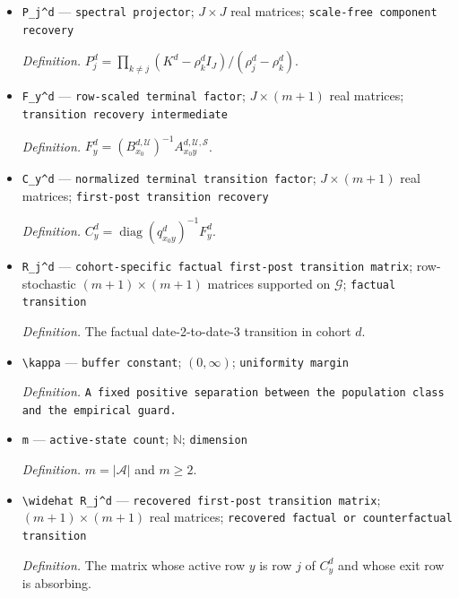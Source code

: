 \documentclass{article}
\begin{document}
\begin{itemize}
  \par\smallskip\noindent\emph{Definition.} The \(j\)-th eigenvalue of \(K^d\), ordered decreasingly.
  \item \texttt{P\_\allowbreak{}j\textasciicircum{}d} --- \texttt{spectral projector}; \(J\times J\) real matrices; \texttt{scale-\allowbreak{}free component recovery}
  \par\smallskip\noindent\emph{Definition.} \(P_j^d=\prod_{k\neq j}(K^d-\rho_k^dI_J)/(\rho_j^d-\rho_k^d)\).
  \item \texttt{F\_\allowbreak{}y\textasciicircum{}d} --- \texttt{row-\allowbreak{}scaled terminal factor}; \(J\times(m+1)\) real matrices; \texttt{transition recovery intermediate}
  \par\smallskip\noindent\emph{Definition.} \(F_y^d=(B_{x_0}^{d,\mathcal U})^{-1}A_{x_0y}^{d,\mathcal U,\mathcal S}\).
  \item \texttt{C\_\allowbreak{}y\textasciicircum{}d} --- \texttt{normalized terminal transition factor}; \(J\times(m+1)\) real matrices; \texttt{first-\allowbreak{}post transition recovery}
  \par\smallskip\noindent\emph{Definition.} \(C_y^d=\operatorname{diag}(q_{x_0y}^d)^{-1}F_y^d\).
  \item \texttt{R\_\allowbreak{}j\textasciicircum{}d} --- \texttt{cohort-\allowbreak{}specific factual first-\allowbreak{}post transition matrix}; row-stochastic \((m+1)\times(m+1)\) matrices supported on \(\mathcal G\); \texttt{factual transition}
  \par\smallskip\noindent\emph{Definition.} The factual date-2-to-date-3 transition in cohort \(d\).
  \item \texttt{\textbackslash{}\allowbreak{}kappa} --- \texttt{buffer constant}; \((0,\infty)\); \texttt{uniformity margin}
  \par\smallskip\noindent\emph{Definition.} \texttt{A fixed positive separation between the population class and the empirical guard.}
  \item \texttt{m} --- \texttt{active-\allowbreak{}state count}; \(\mathbb N\); \texttt{dimension}
  \par\smallskip\noindent\emph{Definition.} \(m=|\mathcal A|\) and \(m\geq2\).
  \item \texttt{\textbackslash{}\allowbreak{}widehat R\_\allowbreak{}j\textasciicircum{}d} --- \texttt{recovered first-\allowbreak{}post transition matrix}; \((m+1)\times(m+1)\) real matrices; \texttt{recovered factual or counterfactual transition}
  \par\smallskip\noindent\emph{Definition.} The matrix whose active row \(y\) is row \(j\) of \(C_y^d\) and whose exit row is absorbing.

\end{itemize}
\end{document}
